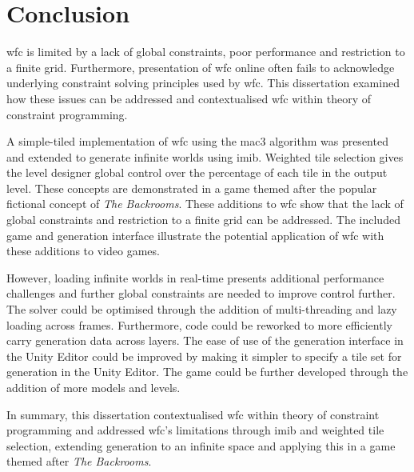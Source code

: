 \chapter{Conclusion}

\acrfull{wfc} is limited by a lack of global constraints, poor performance and restriction to a finite grid. Furthermore, presentation of \acrshort{wfc} online often fails to acknowledge underlying constraint solving principles used by \acrshort{wfc}. This dissertation examined how these issues can be addressed and contextualised \acrshort{wfc} within theory of constraint programming.

A simple-tiled implementation of \acrshort{wfc} using the \acrfull{mac3} algorithm was presented and extended to generate infinite worlds using \acrfull{imib}. Weighted tile selection gives the level designer global control over the percentage of each tile in the output level. These concepts are demonstrated in a game themed after the popular fictional concept of \textit{The Backrooms}. These additions to \acrshort{wfc} show that the lack of global constraints and restriction to a finite grid can be addressed. The included game and generation interface illustrate the potential application of \acrshort{wfc} with these additions to video games.

However, loading infinite worlds in real-time presents additional performance challenges and further global constraints are needed to improve control further. The solver could be optimised through the addition of multi-threading and lazy loading across frames. Furthermore, code could be reworked to more efficiently carry generation data across layers. The ease of use of the generation interface in the Unity Editor could be improved by making it simpler to specify a tile set for generation in the Unity Editor. The game could be further developed through the addition of more models and levels.

In summary, this dissertation contextualised \acrshort{wfc} within theory of constraint programming and addressed \acrshort{wfc}'s limitations through \acrshort{imib} and weighted tile selection, extending generation to an infinite space and applying this in a game themed after \textit{The Backrooms}.

